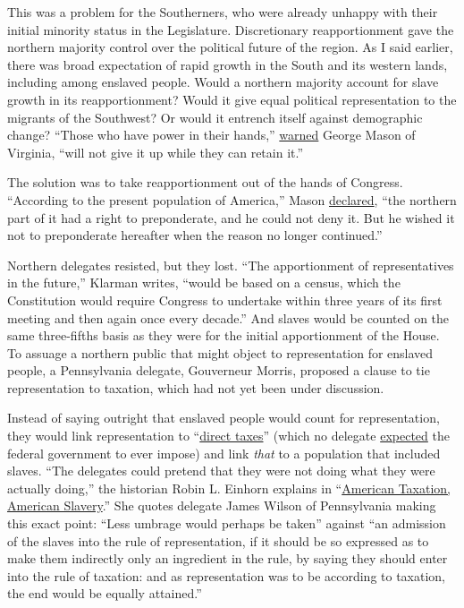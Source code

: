 This was a problem for the Southerners, who were already unhappy with
their initial minority status in the Legislature. Discretionary
reapportionment gave the northern majority control over the political
future of the region. As I said earlier, there was broad expectation of
rapid growth in the South and its western lands, including among
enslaved people. Would a northern majority account for slave growth in
its reapportionment? Would it give equal political representation to the
migrants of the Southwest? Or would it entrench itself against
demographic change? ``Those who have power in their hands,''
\href{https://avalon.law.yale.edu/18th_century/debates_711.asp}{warned}
George Mason of Virginia, ``will not give it up while they can retain
it.''

The solution was to take reapportionment out of the hands of Congress.
``According to the present population of America,'' Mason
\href{https://teachingamericanhistory.org/resources/ratification/elliot/vol5/0711_1787/}{declared},
``the northern part of it had a right to preponderate, and he could not
deny it. But he wished it not to preponderate hereafter when the reason
no longer continued.''

Northern delegates resisted, but they lost. ``The apportionment of
representatives in the future,'' Klarman writes, ``would be based on a
census, which the Constitution would require Congress to undertake
within three years of its first meeting and then again once every
decade.'' And slaves would be counted on the same three-fifths basis as
they were for the initial apportionment of the House. To assuage a
northern public that might object to representation for enslaved people,
a Pennsylvania delegate, Gouverneur Morris, proposed a clause to tie
representation to taxation, which had not yet been under discussion.

Instead of saying outright that enslaved people would count for
representation, they would link representation to
``\href{https://avalon.law.yale.edu/18th_century/debates_913.asp}{direct
taxes}'' (which no delegate \href{https://d.pr/n/B8wyIJ}{expected} the
federal government to ever impose) and link \emph{that} to a population
that included slaves. ``The delegates could pretend that they were not
doing what they were actually doing,'' the historian Robin L. Einhorn
explains in
``\href{https://books.google.com/books/about/American_Taxation_American_Slavery.html?id=97qls5TNm_8C\&source=kp_book_description}{American
Taxation, American Slavery}.'' She quotes delegate James Wilson of
Pennsylvania making this exact point: ``Less umbrage would perhaps be
taken'' against ``an admission of the slaves into the rule of
representation, if it should be so expressed as to make them indirectly
only an ingredient in the rule, by saying they should enter into the
rule of taxation: and as representation was to be according to taxation,
the end would be equally attained.''

